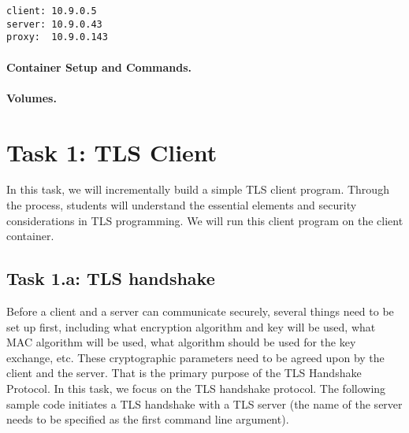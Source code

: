 \begin{lstlisting}
client: 10.9.0.5
server: 10.9.0.43
proxy:  10.9.0.143
\end{lstlisting}
 


\paragraph{Container Setup and Commands.}




\paragraph{Volumes.} 






\section{Task 1: TLS Client}


In this task, we will incrementally build a simple TLS 
client program. Through the process, students will 
understand the essential elements and 
security considerations in TLS programming. We will run 
this client program on the client container.


\subsection{Task 1.a: TLS handshake}


Before a client and a server can communicate securely, several things need to be set up first,
including what encryption algorithm and key will be used, what MAC algorithm will be used, what
algorithm should be used for the key exchange, etc. These cryptographic parameters need to be
agreed upon by the client and the server. That is the primary purpose of the TLS Handshake
Protocol. In this task, we focus on the TLS handshake protocol. 
The following sample code initiates a TLS handshake with
a TLS server (the name of the server needs to be specified as the first command line argument).


